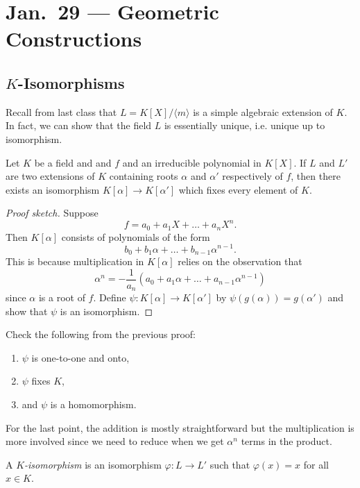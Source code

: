 \chapter{Jan.~29 --- Geometric Constructions}

\section{\texorpdfstring{$K$-Isomorphisms}{K-Isomorphisms}}
Recall from last class that $L = K[X] / \langle m \rangle$
is a simple algebraic extension of $K$. In fact, we
can show that the field $L$ is essentially unique,
i.e. unique up to isomorphism.
\begin{theorem}
  \label{thm:isomorphism-fix}
  Let $K$ be a field and and $f$ and an irreducible
  polynomial in $K[X]$. If $L$ and $L'$ are two extensions
  of $K$ containing roots $\alpha$ and $\alpha'$
  respectively of $f$, then there exists an isomorphism
  $K[\alpha] \to K[\alpha']$ which fixes every element
  of $K$.
\end{theorem}

\begin{proof}[Proof sketch]
  Suppose
  \[
    f = a_0 + a_1 X + \dots + a_n X^n.
  \]
  Then $K[\alpha]$ consists of polynomials of the form
  \[
    b_0 + b_1 \alpha + \dots + b_{n-1} \alpha^{n-1}.
  \]
  This is because multiplication in $K[\alpha]$ relies on
  the observation that
  \[
    \alpha^n = -\frac{1}{a_n} (a_0 + a_1 \alpha + \dots + a_{n-1} \alpha^{n-1})
  \]
  since $\alpha$ is a root of $f$. Define
  $\psi : K[\alpha] \to K[\alpha']$ by
  $\psi(g(\alpha)) = g(\alpha')$ and show that $\psi$
  is an isomorphism.
\end{proof}

\begin{exercise}
  Check the following from the previous proof:
  \begin{enumerate}
    \item $\psi$ is one-to-one and onto,
    \item $\psi$ fixes $K$,
    \item and $\psi$ is a homomorphism.
  \end{enumerate}
  For the last point, the addition is mostly
  straightforward
  but the multiplication is more involved since
  we need to reduce when we get $\alpha^n$ terms
  in the product.
\end{exercise}

\begin{definition}
  A \emph{$K$-isomorphism} is an isomorphism
  $\varphi : L \to L'$
  such that $\varphi(x) = x$ for all $x \in K$.
\end{definition}

